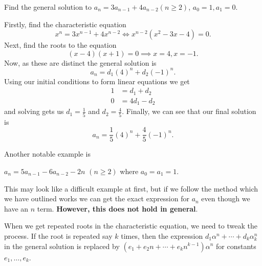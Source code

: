 \documentclass[10pt, a4paper]{article}
\begin{document}
\begin{example}
    Find the general solution to $a_{n} = 3a_{n - 1} + 4a_{n - 2} (n \geq 2)$, $a_0 = 1, a_1 = 0$.

    Firstly,
    find the characteristic equation
    \[
    x ^ n = 3x ^ {n - 1} + 4x ^ {n - 2} \iff x ^ {n - 2}(x ^ 2 - 3x - 4) = 0.
    \]
    Next,
    find the roots to the equation
    \[
    (x - 4)(x + 1) = 0 \implies x = 4, x = -1.
    \]
    Now,
    as these are distinct the general solution is
    \[
    a_n = d_1(4) ^ n + d_2(-1) ^ n.
    \]
    Using our initial conditions to form linear equations we get
    \begin{align*}
        1 &= d_1 + d_2 \\
        0 &= 4d_1 - d_2
    \end{align*}
    and solving gets us $d_1 = \frac{1}{5}$ and $d_2 = \frac{4}{5}$.
    Finally,
    we can see that our final solution is
    \[
    a_n = \frac{1}{5}(4) ^ n + \frac{4}{5}(-1) ^ n.
    \]
\end{example}

Another notable example is
\begin{example}
    $a_n = 5a_{n - 1} - 6a_{n - 2} - 2n$ $(n \geq 2)$ where $a_0 = a_1 = 1$.
\end{example}
This may look like a difficult example at first,
but if we follow the method which we have outlined works we can get the exact expression for $a_n$ even though we have an $n$ term.
\textbf{However, this does not hold in general}.

When we get repeated roots in the characteristic equation,
we need to tweak the process.
If the root is repeated say $k$ times,
then the expression $d_1\alpha ^ n + \dotsi + d_k\alpha_k ^ n$ in the general solution is replaced by $(e_1 + e_2n + \dotsi + e_kn ^ {k - 1})\alpha ^ n$ for constants $e_1, \dotsc, e_k$.
\end{document}
